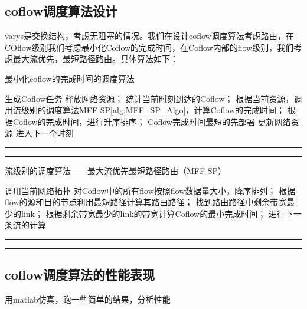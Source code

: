 \documentclass[a4paper, 11pt]{article}                                                   %
\begin{document}
\begin{CJK*}{UTF8}{song}
\subsection{coflow调度算法设计}
varys是交换结构，考虑无阻塞的情况。我们在设计coflow调度算法考虑路由，在COflow级别我们考虑最小化Coflow的完成时间，在Coflow内部的flow级别，我们考虑最大流优先，最短路径路由。具体算法如下：

\begin{algorithm}[H]
    \caption{最小化coflow的完成时间的调度算法}
    \label{alg:min_cct_Algo} %
    \begin{algorithmic}[1]  %
    \STATE 生成Coflow任务
            \STATE 释放网络资源；
        \ENDIF
        \STATE 统计当前时刻到达的Coflow；
            \STATE 根据当前资源，调用流级别的调度算法MFF-SP\ref{alg:MFF_SP_Algo}，计算Coflow的完成时间；
            \STATE 根据Coflow的完成时间，进行升序排序；
            \STATE Coflow完成时间最短的先部署
            \STATE 更新网络资源
        \ELSE
            \STATE 进入下一个时刻
        \ENDIF
    \ENDFOR
    \end{algorithmic}
\end{algorithm}
\noindent\hrule
\vspace{0.1em}\noindent\hrule

\begin{algorithm}[H]
    \caption{流级别的调度算法——最大流优先最短路径路由（MFF-SP）}
    \label{alg:MFF_SP_Algo} %
    \begin{algorithmic}[1]  %
    \STATE 调用当前网络拓扑
    \STATE 对Coflow中的所有flow按照flow数据量大小，降序排列；
            \STATE 根据flow的源和目的节点利用最短路径计算其路由路径；
            \STATE 找到路由路径中剩余带宽最少的link；
            \STATE 根据剩余带宽最少的link的带宽计算Coflow的最小完成时间；
        \ELSE
            \STATE 进行下一条流的计算
        \ENDIF
    \ENDFOR
    \end{algorithmic}
\end{algorithm}
\noindent\hrule
\vspace{0.1em}\noindent\hrule
\subsection{coflow调度算法的性能表现}
用matlab仿真，跑一些简单的结果，分析性能


\end{CJK*}
\end{document}
